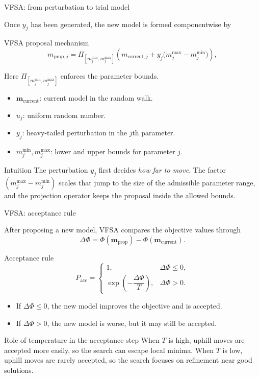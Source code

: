 \documentclass[aspectratio=169]{beamer}
\renewcommand{\vec}[1]{\mathbf{#1}}
\newcommand{\mm}{ {\vec{m}} }
\begin{document}
\begin{frame}{VFSA: from perturbation to trial model}
\small

Once $y_j$ has been generated, the new model is formed componentwise by

\begin{alertblock}{VFSA proposal mechanism}
\[
m_{\mathrm{prop},j}
=
\Pi_{[m_j^{\min},m_j^{\max}]}
\left(
m_{\mathrm{current},j}
+
y_j\big(m_j^{\max}-m_j^{\min}\big)
\right),
\]
\end{alertblock}

Here $\Pi_{[m_j^{\min},m_j^{\max}]}$ enforces the parameter bounds.

\begin{itemize}
    \item[--] $\mm_{\mathrm{current}}$: current model in the random walk.
    \item[--] $u_j$: uniform random number.
    \item[--] $y_j$: heavy-tailed perturbation in the $j$th parameter.
    \item[--] $m_j^{\min},m_j^{\max}$: lower and upper bounds for parameter $j$.
\end{itemize}

\begin{block}{Intuition}
The perturbation $y_j$ first decides \emph{how far to move}. The factor $(m_j^{\max}-m_j^{\min})$ scales that jump to the size of the admissible parameter range, and the projection operator keeps the proposal inside the allowed bounds.
\end{block}
\end{frame}

\begin{frame}{VFSA: acceptance rule}
\small

After proposing a new model, VFSA compares the objective values through
\[
\Delta\Phi = \Phi(\mm_{\mathrm{prop}}) - \Phi(\mm_{\mathrm{current}}).
\]

\begin{alertblock}{Acceptance rule}
\[
P_{\mathrm{acc}} =
\begin{cases}
1, & \Delta\Phi \leq 0,\\
\exp\!\left(-\dfrac{\Delta\Phi}{T}\right), & \Delta\Phi > 0.
\end{cases}
\]
\end{alertblock}

\begin{itemize}
    \item[--] If $\Delta\Phi \leq 0$, the new model improves the objective and is accepted.
    \item[--] If $\Delta\Phi > 0$, the new model is worse, but it may still be accepted.
\end{itemize}

\begin{alertblock}{Role of temperature in the acceptance step}
When $T$ is high, uphill moves are accepted more easily, so the search can escape local minima. When $T$ is low, uphill moves are rarely accepted, so the search focuses on refinement near good solutions.
\end{alertblock}
\end{frame}
\end{document}
